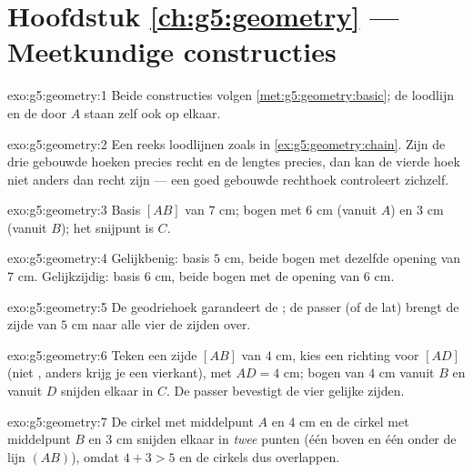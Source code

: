 \section*{Hoofdstuk \ref{ch:g5:geometry} --- Meetkundige constructies}

\begin{solution}{exo:g5:geometry:1}
Beide constructies volgen \cref{met:g5:geometry:basic}; de loodlijn en de
 door $A$ staan zelf ook  op elkaar.
\end{solution}

\begin{solution}{exo:g5:geometry:2}
Een reeks loodlijnen zoals in \cref{ex:g5:geometry:chain}. Zijn de drie
gebouwde hoeken precies recht en de lengtes precies, dan kan de vierde hoek
niet anders dan recht zijn --- een goed gebouwde rechthoek controleert
zichzelf.
\end{solution}

\begin{solution}{exo:g5:geometry:3}
Basis $[AB]$ van $7$ cm; bogen met  $6$ cm (vanuit $A$) en $3$ cm
(vanuit $B$); het snijpunt is $C$.
\end{solution}

\begin{solution}{exo:g5:geometry:4}
Gelijkbenig: basis $5$ cm, beide bogen met dezelfde opening van $7$ cm.
Gelijkzijdig: basis $6$ cm, beide bogen met de opening van $6$ cm.
\end{solution}

\begin{solution}{exo:g5:geometry:5}
De geodriehoek garandeert de ; de passer (of de lat) brengt de
zijde van $5$ cm naar alle vier de zijden over.
\end{solution}

\begin{solution}{exo:g5:geometry:6}
Teken een zijde $[AB]$ van $4$ cm, kies een richting voor $[AD]$ (niet
, anders krijg je een vierkant), met $AD = 4$ cm; bogen van $4$ cm
vanuit $B$ en vanuit $D$ snijden elkaar in $C$. De passer bevestigt de vier
gelijke zijden.
\end{solution}

\begin{solution}{exo:g5:geometry:7}
De cirkel met middelpunt $A$ en  $4$ cm en de cirkel met middelpunt $B$
en  $3$ cm snijden elkaar in \emph{twee} punten (één boven en één onder
de lijn $(AB)$), omdat $4 + 3 > 5$ en de cirkels dus overlappen.
\end{solution}

